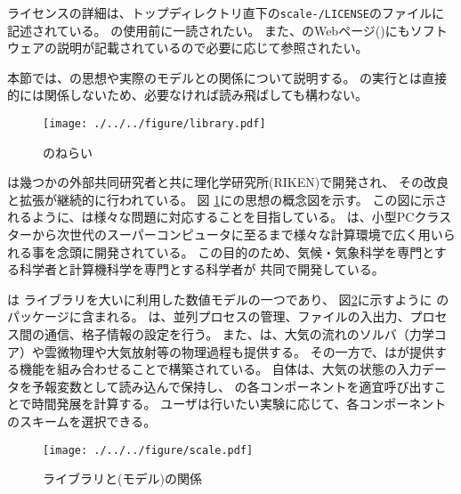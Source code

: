ライセンスの詳細は、トップディレクトリ直下の\texttt{scale-\version/LICENSE}のファイルに記述されている。
\scalelib の使用前に一読されたい。
また、\scalelib のWebページ(\scaleweb)にもソフトウェアの説明が記載されているので必要に応じて参照されたい。

本節では、\scalelib の思想や実際のモデルとの関係について説明する。
\scalerm の実行とは直接的には関係しないため、必要なければ読み飛ばしても構わない。


\newpage
{}

\begin{figure}[htb]
\begin{center}
  \texttt{[image: ./../../figure/library.pdf]}\\
  \caption{\scalelib のねらい}
  \label{fig:scale}
\end{center}
\end{figure}

\scalelib は幾つかの外部共同研究者と共に理化学研究所(RIKEN)で開発され、
その改良と拡張が継続的に行われている。
図 \ref{fig:scale}に\scalelib の思想の概念図を示す。
この図に示されるように、\scalelib は様々な問題に対応することを目指している。
\scalelib は、小型PCクラスターから次世代のスーパーコンピュータに至るまで様々な計算環境で広く用いられる事を念頭に開発されている。
この目的のため、気候・気象科学を専門とする科学者と計算機科学を専門とする科学者が
共同で開発している。

\scalerm は \scalelib ライブラリを大いに利用した数値モデルの一つであり、
図\ref{fig:scale-rm}に示すように \scalelib のパッケージに含まれる。
\scalelib は、並列プロセスの管理、ファイルの入出力、プロセス間の通信、格子情報の設定を行う。
また、\scalelib は、大気の流れのソルバ（力学コア）や雲微物理や大気放射等の物理過程も提供する。
その一方で、\scalerm は\scalelib が提供する機能を組み合わせることで構築されている。
\scalerm 自体は、大気の状態の入力データを予報変数として読み込んで保持し、
\scalelib の各コンポーネントを適宜呼び出すことで時間発展を計算する。
ユーザは行いたい実験に応じて、各コンポーネントのスキームを選択できる。

\begin{figure}[hbt]
\begin{center}
  \texttt{[image: ./../../figure/scale.pdf]}\\
  \caption{{\scalelib}ライブラリと{\scalerm}(モデル)の関係}
  \label{fig:scale-rm}
\end{center}
\end{figure}



